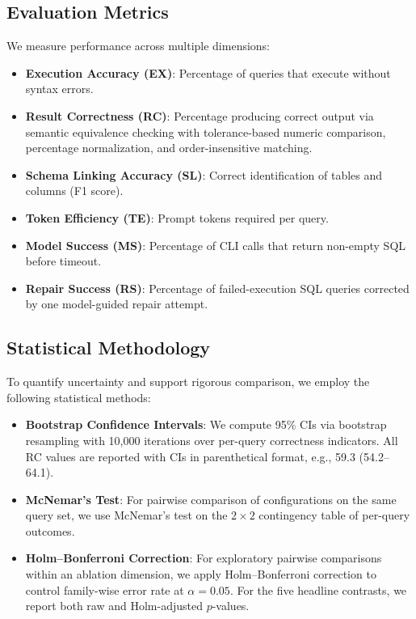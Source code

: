 \documentclass[sigconf, nonacm]{acmart}
\begin{document}
\subsection{Evaluation Metrics}
We measure performance across multiple dimensions:
\begin{itemize}
    \item \textbf{Execution Accuracy (EX)}: Percentage of queries that execute without syntax errors.
    \item \textbf{Result Correctness (RC)}: Percentage producing correct output via semantic equivalence checking with tolerance-based numeric comparison, percentage normalization, and order-insensitive matching.
    \item \textbf{Schema Linking Accuracy (SL)}: Correct identification of tables and columns (F1 score).
    \item \textbf{Token Efficiency (TE)}: Prompt tokens required per query.
    \item \textbf{Model Success (MS)}: Percentage of CLI calls that return non-empty SQL before timeout.
    \item \textbf{Repair Success (RS)}: Percentage of failed-execution SQL queries corrected by one model-guided repair attempt.
\end{itemize}

\subsection{Statistical Methodology}
To quantify uncertainty and support rigorous comparison, we employ the following statistical methods:
\begin{itemize}
    \item \textbf{Bootstrap Confidence Intervals}: We compute 95\% CIs via bootstrap resampling with 10{,}000 iterations over per-query correctness indicators. All RC values are reported with CIs in parenthetical format, e.g., 59.3 (54.2--64.1).
    \item \textbf{McNemar's Test}: For pairwise comparison of configurations on the same query set, we use McNemar's test on the $2 \times 2$ contingency table of per-query outcomes.
    \item \textbf{Holm--Bonferroni Correction}: For exploratory pairwise comparisons within an ablation dimension, we apply Holm--Bonferroni correction to control family-wise error rate at $\alpha = 0.05$. For the five headline contrasts, we report both raw and Holm-adjusted $p$-values.
\end{itemize}
\end{document}
